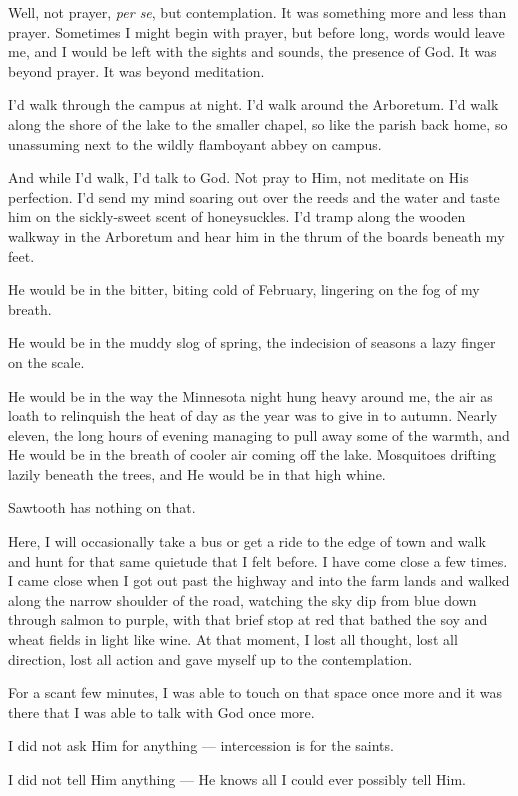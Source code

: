 Well, not prayer, \emph{per se}, but contemplation. It was something more and less than prayer. Sometimes I might begin with prayer, but before long, words would leave me, and I would be left with the sights and sounds, the presence of God. It was beyond prayer. It was beyond meditation.

I'd walk through the campus at night. I'd walk around the Arboretum. I'd walk along the shore of the lake to the smaller chapel, so like the parish back home, so unassuming next to the wildly flamboyant abbey on campus.

And while I'd walk, I'd talk to God. Not pray to Him, not meditate on His perfection. I'd send my mind soaring out over the reeds and the water and taste him on the sickly-sweet scent of honeysuckles. I'd tramp along the wooden walkway in the Arboretum and hear him in the thrum of the boards beneath my feet.

He would be in the bitter, biting cold of February, lingering on the fog of my breath.

He would be in the muddy slog of spring, the indecision of seasons a lazy finger on the scale.

He would be in the way the Minnesota night hung heavy around me, the air as loath to relinquish the heat of day as the year was to give in to autumn. Nearly eleven, the long hours of evening managing to pull away some of the warmth, and He would be in the breath of cooler air coming off the lake. Mosquitoes drifting lazily beneath the trees, and He would be in that high whine.

Sawtooth has nothing on that.

Here, I will occasionally take a bus or get a ride to the edge of town and walk and hunt for that same quietude that I felt before. I have come close a few times. I came close when I got out past the highway and into the farm lands and walked along the narrow shoulder of the road, watching the sky dip from blue down through salmon to purple, with that brief stop at red that bathed the soy and wheat fields in light like wine. At that moment, I lost all thought, lost all direction, lost all action and gave myself up to the contemplation.

For a scant few minutes, I was able to touch on that space once more and it was there that I was able to talk with God once more.

I did not ask Him for anything --- intercession is for the saints.

I did not tell Him anything --- He knows all I could ever possibly tell Him.

